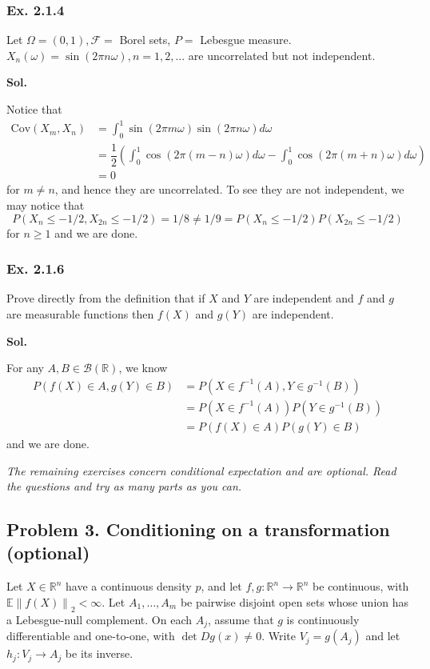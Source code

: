 \documentclass[lang=en,11pt,a4paper,citestyle=authoryear]{elegantpaper}
\newcommand{\R}{\mathbb{R}}
\newcommand{\B}{\mathcal{B}}
\newcommand{\E}{\mathbb{E}}
\newcommand{\norm}[1]{\left\lVert#1\right\rVert}
\begin{document}
\subsubsection*{Ex. 2.1.4}
Let $\Omega = (0,1), \mathcal{F} =$ Borel sets, $P =$ Lebesgue measure. $X_n(\omega) =
\sin(2\pi n\omega), n = 1,2,...$ are uncorrelated but not independent.
\par\vspace{0.5em}
\textbf{Sol.}\par
Notice that
\[
\begin{aligned}
\text{Cov}(X_m,X_n) &= \int_0^1 \sin(2\pi m \omega)\sin(2\pi n \omega)d\omega \\ &= \dfrac{1}{2}\left(\int_0^1 \cos(2\pi(m-n)\omega)d\omega - \int_0^1 \cos(2\pi(m+n)\omega)d\omega\right)
\\ &= 0 \end{aligned}
\]
for $m\neq n$, and hence they are uncorrelated. To see they are not independent, we may notice that
\[
P( X_n \leq -1/2,  X_{2n} \leq -1/2) = 1/8 \neq 1/9 = P(X_n \leq -1/2)P(X_{2n} \leq -1/2)
\]
for $n\geq 1$ and we are done.
\vspace{1em}

\subsubsection*{Ex. 2.1.6}
Prove directly from the definition that if $X$ and $Y$ are independent and $f$ and $g$ are measurable functions then $f(X)$ and $g(Y)$ are
independent.
\par\vspace{0.5em}
\textbf{Sol.}\par
For any $A,B \in \B(\R)$, we know
\[
\begin{aligned}
P(f(X) \in A, g(Y)\in B) &= P(X\in f^{-1}(A), Y\in g^{-1}(B))\\ &= P(X\in f^{-1}(A))P(Y\in g^{-1}(B))\\ &= P(f(X) \in A)P(g(Y) \in B)
\end{aligned}
\]
and we are done.
\vspace{1em}

\newpage
\noindent\textit{The remaining exercises concern conditional expectation and are optional. Read the questions and try as many parts as you can.}

\subsection*{Problem 3. Conditioning on a transformation (optional)}
Let $X\in\R^n$ have a continuous density $p$, and let $f,g:\R^n\to\R^n$ be continuous, with $\E\norm{f(X)}_2<\infty$.
Let $A_1,\ldots,A_m$ be pairwise disjoint open sets whose union has a Lebesgue-null complement. On each $A_j$, assume that $g$ is continuously differentiable and one-to-one, with $\det Dg(x)\neq0$. Write $V_j=g(A_j)$ and let $h_j:V_j\to A_j$ be its inverse.
\end{document}
